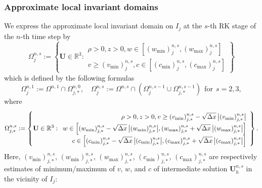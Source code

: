 \documentclass[times,final]{elsarticle}
\numberwithin{equation}{section}
\theoremstyle{definition}
\theoremstyle{remark}
\newcommand{\BU}{\mathbf{U}}
\begin{document}
\subsubsection{Approximate local invariant domains}\label{sec:local}

We express the approximate local invariant domain on $I_j$ at the $s$-th RK stage of the $n$-th time step by
\begin{equation}\label{eq:1851}
	\Omega^{n,s}_j :=
	\left\{
	\BU \in \mathbb{R}^3
	:
	\begin{array}{r}
		\rho > 0, z>0, w \in \left[ (w_{\min})^{n,s}_j, (w_{\max})^{n,s}_j \right] \\
		v \ge (v_{\min})^{n,s}_j, c \in \left[ (c_{\min})^{n,s}_j, (c_{\max})^{n,s}_j  \right]
	\end{array}
	\right\}
\end{equation}
which is defined by the following formulas
\begin{equation}\label{eq:1917}
	\Omega^{n,1}_j := \Omega^{n,1} \cap \Omega^{n,0}_{j,*},
	\quad
	\Omega^{n,s}_j := \Omega^{n,s} \cap \left( \Omega^{n,s-1}_{j} \cup \Omega^{n,s-1}_{j,*} \right) ~~
	\textrm{for} ~~ s = 2,3,
\end{equation}
where
\begin{equation}\label{eq:1927}
	\Omega^{n,s}_{j,*}
	:=
	\left\{ 
	\BU \in \mathbb{R}^3 
	:
	\renewcommand\arraystretch{1.5}
	\begin{array}{r}
		\rho > 0, z > 0, 
		v \ge (v_{\min})^{n,s}_{j,*}-\sqrt{\Delta x} \, \big|(v_{\min})^{n,s}_{j,*}\big| \\
		w \in 
		\left[
		(w_{\min})^{n,s}_{j,*}-\sqrt{\Delta x} \,\big|(w_{\min})^{n,s}_{j,*}\big|,
		(w_{\max})^{n,s}_{j,*}+\sqrt{\Delta x} \,\big|(w_{\max})^{n,s}_{j,*}\big|
		\right] \\
		c \in 
		\left[
		(c_{\min})^{n,s}_{j,*}-\sqrt{\Delta x} \,\big|(c_{\min})^{n,s}_{j,*}\big|,
		(c_{\max})^{n,s}_{j,*}+\sqrt{\Delta x} \,\big|(c_{\max})^{n,s}_{j,*}\big|
		\right]
	\end{array}
	\right\}.
\end{equation}
Here, $(v_{\min})^{n,s}_{j,*}$, $(w_{\min})^{n,s}_{j,*}$, $(w_{\max})^{n,s}_{j,*}$, $(c_{\min})^{n,s}_{j,*}$, $(c_{\max})^{n,s}_{j,*}$ are respectively estimates of minimum/maximum of $v$, $w$, and $c$ of intermediate solution $\BU^{n,s}_h$ in the vicinity of $I_j$:
\end{document}
